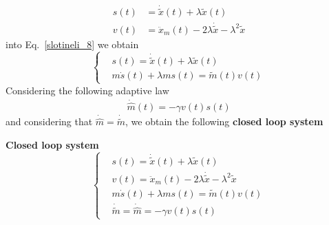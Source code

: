 \documentclass[12pt,a4paper,oneside]{book}
\begin{document}
\begin{onehalfspace}
\begin{example}
\begin{equation}
\begin{aligned}
			s(t) &= \dot{\tilde{x}}(t)+\lambda\tilde{x}(t) \\[6pt]
			v(t) &= \ddot{x}_m(t)-2\lambda\dot{\tilde{x}}-\lambda^2\tilde{x}
		\end{aligned}
	\end{equation} 
	into Eq.~\ref{slotineli_8} we obtain 
	\begin{equation}\label{slotineli_10}
		\left\lbrace \begin{aligned}
			&s(t) = \dot{\tilde{x}}(t)+\lambda\tilde{x}(t) \\[6pt]
			&m\dot{s}(t)+\lambda m s(t) = \tilde{m}(t)v(t)
		\end{aligned}\right. 
	\end{equation} 
	Considering the following adaptive law
	\begin{equation}\label{slotineli_11}
		\begin{aligned}
			\dot{\hat{m}}(t) = -\gamma v(t) s(t)
		\end{aligned}
	\end{equation} 
	and considering that $\dot{\hat{m}}=\dot{\tilde{m}}$, we obtain the following \textbf{closed loop system}
	\begin{mybox}
		\textbf{Closed loop system}
		\begin{equation}\label{slotineli_10e}
			\left\lbrace \begin{aligned}
				&s(t) = \dot{\tilde{x}}(t)+\lambda\tilde{x}(t) \\[6pt]
				&v(t) = \ddot{x}_m(t)-2\lambda\dot{\tilde{x}}-\lambda^2\tilde{x} \\[6pt]
				&m\dot{s}(t)+\lambda m s(t) = \tilde{m}(t)v(t) \\[6pt]
				&\dot{\tilde{m}} = \dot{\hat{m}} =-\gamma v(t)s(t)
			\end{aligned}\right. 
		\end{equation} 
		\vspace{0mm}
	\end{mybox}
	

\end{example}
\end{onehalfspace}
\end{document}
